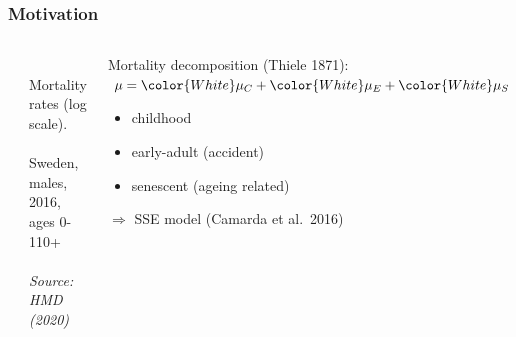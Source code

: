 \documentclass[12pt, xcolor=table]{beamer}  %
\begin{document}
\begin{frame}\frametitle{Motivation}
	\vspace{-0.05cm}
	
	\begin{columns}
		\begin{center}
			\includegraphics[scale=.27]{Figures/Ch3/F7_1}
		\end{center}
		
		\vspace{-0.15cm}
\tiny $\quad\quad\quad$ Mortality rates (log scale). \\
$\quad\quad\quad$ Sweden, males, 2016, ages 0-110+ \\ $\quad\quad\quad$ \textit{Source: HMD (2020)}
		
		
		\begin{center}
			Mortality decomposition {\scriptsize(Thiele 1871)}: $\mu = {\color{White}\mu_C + \color{White}\mu_E + \color{White}\mu_S}$
			\bigskip
			\begin{itemize}
				\item[] {\color{White} childhood}
				\bigskip
				\item[] {\color{White} early-adult (accident) }
				\bigskip
				\item[] {\color{White} senescent (ageing related)}
				\bigskip
			\end{itemize}
			\vspace{0.15cm}
			{\color{White} $\Rightarrow$ SSE model {\scriptsize (Camarda et al.~2016)}}
		\end{center}		
		
	\end{columns}
	
	
\end{frame}
\end{document}
